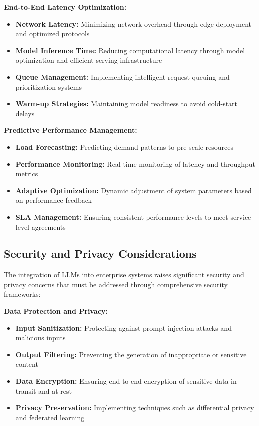 \textbf{End-to-End Latency Optimization:}
\begin{itemize}
    \item \textbf{Network Latency:} Minimizing network overhead through edge deployment and optimized protocols
    \item \textbf{Model Inference Time:} Reducing computational latency through model optimization and efficient serving infrastructure
    \item \textbf{Queue Management:} Implementing intelligent request queuing and prioritization systems
    \item \textbf{Warm-up Strategies:} Maintaining model readiness to avoid cold-start delays
\end{itemize}

\textbf{Predictive Performance Management:}
\begin{itemize}
    \item \textbf{Load Forecasting:} Predicting demand patterns to pre-scale resources
    \item \textbf{Performance Monitoring:} Real-time monitoring of latency and throughput metrics
    \item \textbf{Adaptive Optimization:} Dynamic adjustment of system parameters based on performance feedback
    \item \textbf{SLA Management:} Ensuring consistent performance levels to meet service level agreements
\end{itemize}

\subsection{Security and Privacy Considerations}

The integration of LLMs into enterprise systems raises significant security and privacy concerns that must be addressed through comprehensive security frameworks:

\textbf{Data Protection and Privacy:}
\begin{itemize}
    \item \textbf{Input Sanitization:} Protecting against prompt injection attacks and malicious inputs
    \item \textbf{Output Filtering:} Preventing the generation of inappropriate or sensitive content
    \item \textbf{Data Encryption:} Ensuring end-to-end encryption of sensitive data in transit and at rest
    \item \textbf{Privacy Preservation:} Implementing techniques such as differential privacy and federated learning
\end{itemize}

